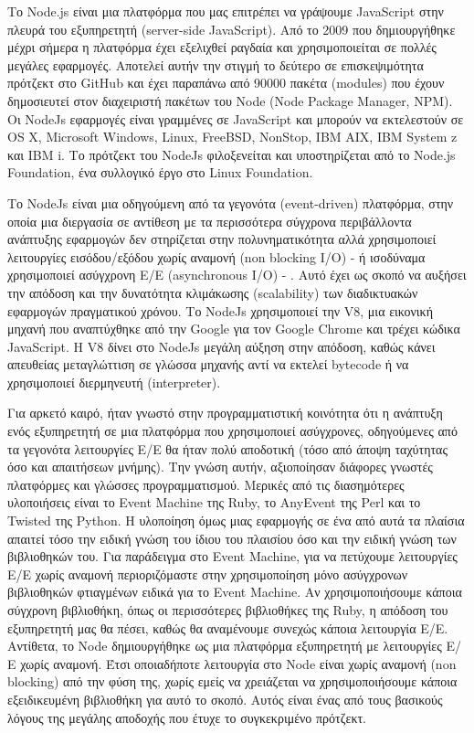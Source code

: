 		Το Node.js είναι μια πλατφόρμα που μας επιτρέπει να γράψουμε JavaScript στην πλευρά του εξυπηρετητή (server-side JavaScript). Από το 2009 που δημιουργήθηκε μέχρι σήμερα η πλατφόρμα έχει εξελιχθεί ραγδαία και χρησιμοποιείται σε πολλές μεγάλες εφαρμογές. Αποτελεί αυτήν την στιγμή το δεύτερο σε επισκεψιμότητα πρότζεκτ στο GitHub και έχει παραπάνω από 90000 πακέτα (modules) που έχουν δημοσιευτεί στον διαχειριστή πακέτων του Node (Node Package Manager, NPM). Οι NodeJs εφαρμογές είναι γραμμένες σε JavaScript και μπορούν να εκτελεστούν σε OS X, Microsoft Windows, Linux, FreeBSD, NonStop, IBM AIX, IBM System z και IBM i. Το πρότζεκτ του NodeJs φιλοξενείται και υποστηρίζεται από το Node.js Foundation,  ένα συλλογικό έργο στο  Linux Foundation.

		Το NodeJs είναι μια οδηγούμενη από τα γεγονότα (event-driven) πλατφόρμα,  στην οποία μια διεργασία σε αντίθεση με τα περισσότερα σύγχρονα περιβάλλοντα ανάπτυξης εφαρμογών  δεν στηρίζεται στην πολυνηματικότητα αλλά χρησιμοποιεί λειτουργίες εισόδου/εξόδου χωρίς αναμονή (non blocking I/O) - ή ισοδύναμα χρησιμοποιεί ασύγχρονη Ε/Ε (asynchronous I/O) - . Αυτό έχει ως σκοπό να αυξήσει την απόδοση και την δυνατότητα κλιμάκωσης (scalability) των διαδικτυακών εφαρμογών πραγματικού χρόνου. Το NodeJs χρησιμοποιεί την V8, μια εικονική μηχανή που αναπτύχθηκε από την Google για τον Google Chrome και τρέχει κώδικα JavaScript. Η V8 δίνει στο NodeJs μεγάλη αύξηση στην απόδοση, καθώς κάνει απευθείας μεταγλώττιση σε γλώσσα μηχανής αντί να εκτελεί bytecode ή να χρησιμοποιεί διερμηνευτή (interpreter).

Για αρκετό καιρό, ήταν γνωστό στην προγραμματιστική κοινότητα ότι η ανάπτυξη ενός
εξυπηρετητή σε μια πλατφόρμα που χρησιμοποιεί ασύγχρονες, οδηγούμενες από τα
γεγονότα λειτουργίες Ε/Ε θα ήταν πολύ αποδοτική (τόσο από άποψη ταχύτητας όσο και
απαιτήσεων μνήμης). Την γνώση αυτήν, αξιοποίησαν διάφορες γνωστές πλατφόρμες και
γλώσσες προγραμματισμού. Μερικές από τις διασημότερες υλοποιήσεις είναι το Event
Machine της Ruby, το AnyEvent της Perl και το Twisted της Python.
Η υλοποίηση όμως μιας εφαρμογής σε ένα από αυτά τα πλαίσια απαιτεί τόσο την ειδική
γνώση του ίδιου του πλαισίου όσο και την ειδική γνώση των βιβλιοθηκών του. Για
παράδειγμα στο Event Machine, για να πετύχουμε λειτουργίες Ε/Ε χωρίς αναμονή
περιοριζόμαστε στην χρησιμοποίηση μόνο ασύγχρονων βιβλιοθηκών φτιαγμένων ειδικά
για το Event Machine. Αν χρησιμοποιήσουμε κάποια σύγχρονη βιβλιοθήκη, όπως οι
περισσότερες βιβλιοθήκες της Ruby, η απόδοση του εξυπηρετητή μας θα πέσει, καθώς
θα αναμένουμε συνεχώς κάποια λειτουργία Ε/Ε. Αντίθετα, το Node δημιουργήθηκε ως
μια πλατφόρμα εξυπηρετητή με λειτουργίες Ε/Ε χωρίς αναμονή. Έτσι οποιαδήποτε
λειτουργία στο Node είναι χωρίς αναμονή (non blocking) από την φύση της, χωρίς εμείς
να χρειάζεται να χρησιμοποιήσουμε κάποια εξειδικευμένη βιβλιοθήκη για αυτό το
σκοπό. Αυτός είναι ένας από τους βασικούς λόγους της μεγάλης αποδοχής που έτυχε το
συγκεκριμένο πρότζεκτ.
	
